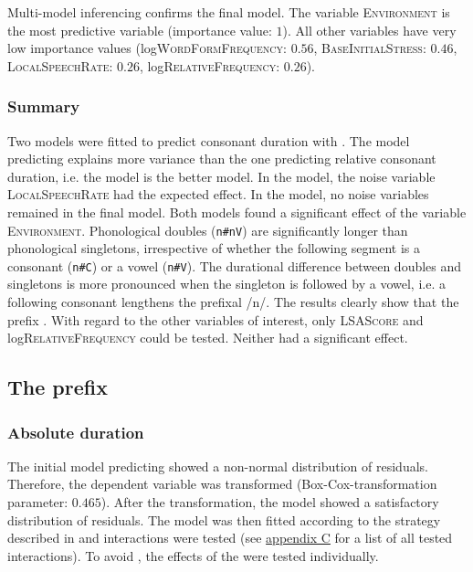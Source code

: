 Multi-model inferencing confirms the final model. The variable \textsc{Environment} is the most predictive variable (importance value: $1$). All other variables have very low importance values  (log\textsc{WordFormFrequency}: $0.56$, \textsc{BaseInitialStress}: $0.46$, \textsc{LocalSpeechRate}: $0.26$, log\textsc{RelativeFrequency}: $0.26$).


\subsubsection{Summary}

Two models were fitted to predict consonant duration with  . The model predicting  explains more variance than the one predicting relative consonant duration, i.e. the  model is the better model. In the  model, the noise variable \textsc{LocalSpeechRate} had the expected effect. In the  model, no noise variables remained in the final model.
 Both models found a significant effect of the variable \textsc{Environment}. Phonological doubles (\texttt{n\#nV}) are significantly longer than phonological singletons, irrespective of whether the following segment is a consonant (\texttt{n\#C}) or a vowel (\texttt{n\#V}). The durational difference between doubles and singletons is more pronounced when the singleton is followed by a vowel, i.e. a following consonant lengthens the prefixal /n/. The results clearly show that the prefix  .
With regard to the other variables of interest, only \textsc{LSAScore} and log\textsc{RelativeFrequency} could be tested. Neither had a significant effect. 


\subsection{The prefix } \label{in corpus}


\subsubsection{Absolute duration}

The initial model predicting  showed a non-normal distribution of residuals. Therefore, the dependent variable was  transformed (Box-Cox-transformation  parameter: $0.465$). After the transformation, the model showed a satisfactory distribution of residuals. The model was then fitted according to the strategy described in  and interactions were tested (see \hyperref[Appendix C: Summaries of tested interactions in corpus study]{appendix C} for a list of all tested interactions). 
To avoid , the effects of the  were tested individually.


